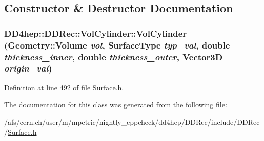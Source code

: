 \subsection{Constructor \& Destructor Documentation}
\hypertarget{class_d_d4hep_1_1_d_d_rec_1_1_vol_cylinder_ae559c0cb9b5a969ba0f14db3d419d376}{
\subsubsection[{VolCylinder}]{\setlength{\rightskip}{0pt plus 5cm}DD4hep::DDRec::VolCylinder::VolCylinder ({\bf Geometry::Volume} {\em vol}, \/  {\bf SurfaceType} {\em typ\_\-val}, \/  double {\em thickness\_\-inner}, \/  double {\em thickness\_\-outer}, \/  {\bf Vector3D} {\em origin\_\-val})}}
\label{class_d_d4hep_1_1_d_d_rec_1_1_vol_cylinder_ae559c0cb9b5a969ba0f14db3d419d376}


Definition at line 492 of file Surface.h.

The documentation for this class was generated from the following file:\begin{DoxyCompactItemize}
\item 
/afs/cern.ch/user/m/mpetric/nightly\_\-cppcheck/dd4hep/DDRec/include/DDRec/\hyperlink{_surface_8h}{Surface.h}\end{DoxyCompactItemize}

